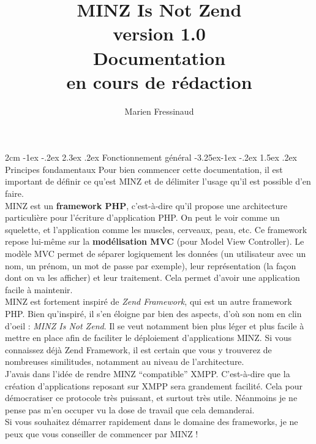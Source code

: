 \documentclass[a4paper,11pt]{article}
\title{MINZ Is Not Zend\\{\small version 1.0}\\\textbf{Documentation\\ {\small en cours de rédaction}}}
\author{Marien Fressinaud}
\makeatletter
\renewcommand\section{\@startsection{section}{1}{\z@}%
	{2cm \@plus -1ex \@minus -.2ex}%
	{2.3ex \@plus.2ex}%
	{\color{bleuClair}\reset@font\Large\bfseries}}
\renewcommand{\subsection}{\@startsection{subsection}{2}{\z@}%
             {-3.25ex\@plus -1ex \@minus -.2ex}%
             {1.5ex \@plus .2ex}%
             {\color{bleuFonce}\normalfont\large\bfseries}}
\makeatother
\begin{document}
\maketitle

\newpage
\tableofcontents
\newpage
\section{Fonctionnement général}
\subsection{Principes fondamentaux}
Pour bien commencer cette documentation, il est important de définir ce qu'est MINZ et de délimiter l'usage qu'il est possible d'en faire.\\

MINZ est un \textbf{framework PHP}, c'est-à-dire qu'il propose une architecture particulière pour l'écriture d'application PHP. On peut le voir comme un squelette, et l'application comme les muscles, cerveaux, peau, etc. Ce framework repose lui-même sur la \textbf{modélisation MVC} (pour Model View Controller). Le modèle MVC permet de séparer logiquement les données (un utilisateur avec un nom, un prénom, un mot de passe par exemple), leur représentation (la façon dont on va les afficher) et leur traitement. Cela permet d'avoir une application facile à maintenir.\\

MINZ est fortement inspiré de \textit{Zend Framework}, qui est un autre framework PHP. Bien qu'inspiré, il s'en éloigne par bien des aspects, d'où son nom en clin d'oeil : \textit{MINZ Is Not Zend}. Il se veut notamment bien plus léger et plus facile à mettre en place afin de faciliter le déploiement d'applications MINZ. Si vous connaissez déjà Zend Framework, il est certain que vous y trouverez de nombreuses similitudes, notamment au niveau de l'architecture.\\

J'avais dans l'idée de rendre MINZ ``compatible'' XMPP. C'est-à-dire que la création d'applications reposant sur XMPP sera grandement facilité. Cela pour démocratiser ce protocole très puissant, et surtout très utile. Néanmoins je ne pense pas m'en occuper vu la dose de travail que cela demanderai.\\

Si vous souhaitez démarrer rapidement dans le domaine des frameworks, je ne peux que vous conseiller de commencer par MINZ !
\end{document}
